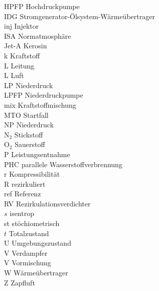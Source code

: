 \begin{tabbing}
    HPFP    \>  Hochdruckpumpe                                      \\
    IDG     \>  Stromgenerator-Ölsystem-Wärmeübertrager             \\
    inj     \>  Injektor                                            \\
    ISA     \>  Normatmosphäre                                      \\
    Jet-A   \>  Kerosin                                             \\
    k       \>  Kraftstoff                                          \\
    L       \>  Leitung                                             \\
    L       \>  Luft                                                \\
    LP      \>  Niederdruck                                         \\
    LPFP    \>  Niederdruckpumpe                                    \\
    mix     \>  Kraftstoffmischung                                  \\
    MTO     \>  Startfall                                           \\
    NP      \>  Niederdruck		                                    \\
    N$_2$   \>  Stickstoff                                          \\
    O$_2$   \>  Sauerstoff                                          \\
    P       \>  Leistungsentnahme                                   \\
    PHC     \>  parallele Wasserstoffverbrennung                    \\
    r       \>  Kompressibilität                                    \\
    R       \>  rezirkuliert                                        \\
    ref     \>  Referenz                                            \\
    RV      \>  Rezirkulationsverdichter                            \\
    $s$     \>  isentrop                                            \\
    st      \>  stöchiometrisch                                     \\
    $t$     \>  Totalzustand                                        \\
    U       \>  Umgebungszustand                                    \\
    V       \>  Verdampfer                                          \\
    V       \>  Vormischung                                         \\
    W       \>  Wärmeübertrager                                     \\
    Z       \>  Zapfluft                                            \\

\end{tabbing}

